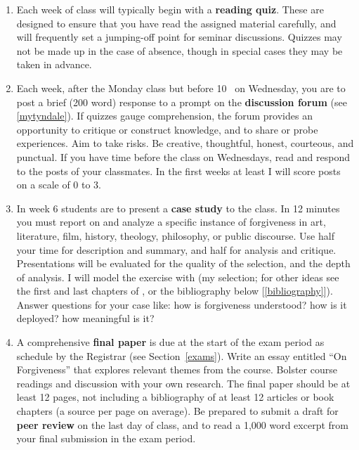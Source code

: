 \documentclass[titlepage]{article}
\begin{document}
\begin{enumerate}

	\item Each week of class will typically begin with a \textbf{reading
	quiz}. These are designed to ensure that you have read the assigned
	material carefully, and will frequently set a jumping-off point for
	seminar discussions. Quizzes may not be made up in the case of
	absence, though in special cases they may be taken in advance.

	\item Each week, after the Monday class but before 10 \AM\ on
	Wednesday, you are to post a brief (200 word) response to a prompt
	on the \textbf{discussion forum} (see \ref{mytyndale}). If quizzes
	gauge comprehension, the forum provides an opportunity to critique
	or construct knowledge, and to share or probe experiences. Aim to
	take risks. Be creative, thoughtful, honest, courteous, and
	punctual. If you have time before the class on Wednesdays, read and
	respond to the posts of your classmates. In the first weeks at least
	I will score posts on a scale of 0 to 3.

	\item In week 6 students are to present a \textbf{case study} to the
	class. In 12 minutes you must report on and analyze a specific
	instance of forgiveness in art, literature, film, history, theology,
	philosophy, or public discourse. Use half your time for description
	and summary, and half for analysis and critique. Presentations will
	be evaluated for the quality of the selection, and the depth of
	analysis. I will model the exercise with \cite{horn} (my selection;
	for other ideas see the first and last chapters of \cite{jones}, or
	the bibliography below [\ref{bibliography}]). Answer questions for
	your case like: how is forgiveness understood? how is it deployed?
	how meaningful is it?

	\item A comprehensive \textbf{final paper} is due at the start of
	the exam period as schedule by the Registrar (see
	Section~\ref{exams}). Write an essay entitled ``On Forgiveness''
	that explores relevant themes from the course. Bolster course
	readings and discussion with your own research. The final paper
	should be at least 12 pages, not including a bibliography of at
	least 12 articles or book chapters (a source per page on average).
	Be prepared to submit a draft for \textbf{peer review} on the last
	day of class, and to read a 1,000 word excerpt from your final
	submission in the exam period.

\end{enumerate}
\end{document}
